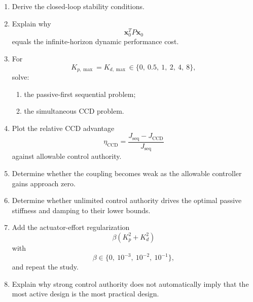 \begin{enumerate}
    \item Derive the closed-loop stability conditions.

    \item Explain why
    \begin{equation}
    \mathbf{x}_0^TP\mathbf{x}_0
    \end{equation}
    equals the infinite-horizon dynamic performance cost.

    \item For
    \begin{equation}
    K_{p,\max}
    =
    K_{d,\max}
    \in
    \{0,\ 0.5,\ 1,\ 2,\ 4,\ 8\},
    \end{equation}
    solve:
    \begin{enumerate}
        \item the passive-first sequential problem;
        \item the simultaneous CCD problem.
    \end{enumerate}

    \item Plot the relative CCD advantage
    \begin{equation}
    \eta_{\mathrm{CCD}}
    =
    \frac{
    J_{\mathrm{seq}}-J_{\mathrm{CCD}}
    }{
    J_{\mathrm{seq}}
    }
    \end{equation}
    against allowable control authority.

    \item Determine whether the coupling becomes weak as the allowable
    controller gains approach zero.

    \item Determine whether unlimited control authority drives the optimal
    passive stiffness and damping to their lower bounds.

    \item Add the actuator-effort regularization
    \begin{equation}
    \beta(K_p^2+K_d^2)
    \end{equation}
    with
    \begin{equation}
    \beta\in\{0,\ 10^{-3},\ 10^{-2},\ 10^{-1}\},
    \end{equation}
    and repeat the study.

    \item Explain why strong control authority does not automatically imply
    that the most active design is the most practical design.
\end{enumerate}


